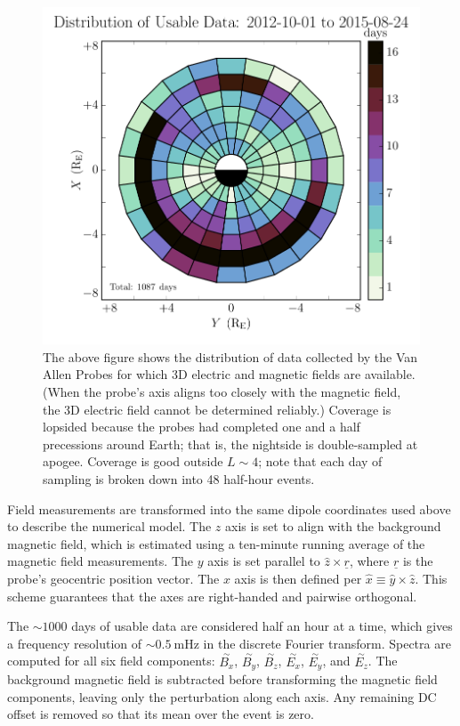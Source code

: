 \documentclass[draft,linenumbers]{agujournal}
\begin{document}
\begin{figure}
    \begin{center}
    \includegraphics[width=\textwidth]{figures/fig_pos.pdf}
    \caption{
        The above figure shows the distribution of data collected by the Van Allen Probes for which 3D electric and magnetic fields are available. (When the probe's axis aligns too closely with the magnetic field, the 3D electric field cannot be determined reliably.) Coverage is lopsided because the probes had completed one and a half precessions around Earth; that is, the nightside is double-sampled at apogee. Coverage is good outside $L\sim4$; note that each day of sampling is broken down into 48 half-hour events.
    }
    \label{fig_pos}
    \end{center}
\end{figure}

Field measurements are transformed into the same dipole coordinates used above to describe the numerical model. The $z$ axis is set to align with the background magnetic field, which is estimated using a ten-minute running average of the magnetic field measurements. The $y$ axis is set parallel to $\hat{z} \times \underline{r}$, where $\underline{r}$ is the probe's geocentric position vector. The $x$ axis is then defined per $\hat{x} \equiv \hat{y} \times \hat{z}$. This scheme guarantees that the axes are right-handed and pairwise orthogonal\citep{liu_2009}.

The $\sim1000$ days of usable data are considered half an hour at a time, which gives a frequency resolution of $\sim\SI{0.5}{\mHz}$ in the discrete Fourier transform. Spectra are computed for all six field components: $\overset{\sim}{B_x}$, $\overset{\sim}{B_y}$, $\overset{\sim}{B_z}$, $\overset{\sim}{E_x}$, $\overset{\sim}{E_y}$, and $\overset{\sim}{E_z}$. The background
magnetic field is subtracted before transforming the magnetic field components, leaving only the perturbation along each axis. Any remaining DC offset is removed so that its mean over the event is zero.
\end{document}
